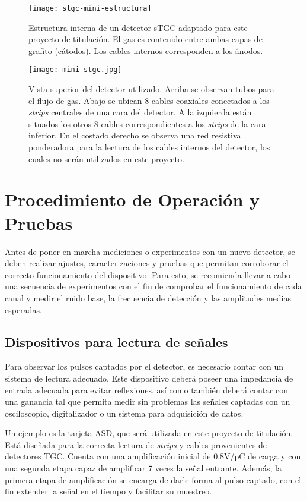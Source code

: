 	\begin{figure}[h]
		\centering
		\texttt{[image: stgc-mini-estructura]}
		\caption{Estructura interna de un detector sTGC adaptado para este proyecto de titulación. El gas es contenido entre ambas capas de grafito (cátodos). Los cables internos corresponden a los ánodos.}
		\label{img:stgc-mini-estructura}
	\end{figure}
	
\newpage
	\begin{figure}[h]
		\centering
		\texttt{[image: mini-stgc.jpg]}
		\caption{Vista superior del detector utilizado. Arriba se observan tubos para el flujo de gas. Abajo se ubican 8 cables coaxiales conectados a los \textit{strips} centrales de una cara del detector. A la izquierda están situados los otros 8 cables correspondientes a los \textit{strips} de la cara inferior. En el costado derecho se observa una red resistiva ponderadora para la lectura de los cables internos del detector, los cuales no serán utilizados en este proyecto.}
		\label{img:foto-mini-stgc}
	\end{figure}

\section{Procedimiento de Operación y Pruebas}
	Antes de poner en marcha mediciones o experimentos con un nuevo detector, se deben realizar ajustes, caracterizaciones y pruebas que permitan corroborar el correcto funcionamiento del dispositivo. Para esto, se recomienda llevar a cabo una secuencia de experimentos con el fin de comprobar el funcionamiento de cada canal y medir el ruido base, la frecuencia de detección y las amplitudes medias esperadas.

	\subsection{Dispositivos para lectura de señales}
		Para observar los pulsos captados por el detector, es necesario contar con un sistema de lectura adecuado. Este dispositivo deberá poseer una impedancia de entrada adecuada para evitar reflexiones, así como también deberá contar con una ganancia tal que permita medir sin problemas las señales captadas con un osciloscopio, digitalizador o un sistema para adquisición de datos.
		
		Un ejemplo es la tarjeta ASD, que será utilizada en este proyecto de titulación. Está diseñada para la correcta lectura de \textit{strips} y cables provenientes de detectores TGC. Cuenta con una amplificación inicial de 0.8V/pC de carga y con una segunda etapa capaz de amplificar 7 veces la señal entrante. Además, la primera etapa de amplificación se encarga de darle forma al pulso captado, con el fin extender la señal en el tiempo y facilitar su muestreo.
		

